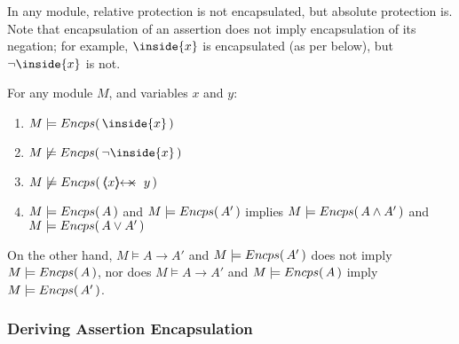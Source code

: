 In any module, relative protection %
is not encapsulated, but  absolute protection is.
 Note  that  encapsulation of an assertion does not imply encapsulation of its negation; 
 for example,  ${\inside{x}}$ is encapsulated (as per below), but $\neg  {\inside{x}}$ is not.


\begin{lemma}
For any module $M$, and variables $x$ and $y$:
\begin{enumerate} 
\item $M \models \encaps{\inside{x}}$
\item $M \not\models {\encaps{\neg\inside{x}}}$
\item $M \not\models {\encaps{\protectedFrom{x}{y}}}$
\item  $M \models  {\ensuremath Encps(\, A\, )}$ and $M \models  {\ensuremath Encps(\, A'\, )}$ implies 
$M \models  {\ensuremath Encps(\, A \wedge A'\, )}$ and $M \models  {\ensuremath Encps(\, A \vee A'\, )}$
\end{enumerate}
\end{lemma}

On the other hand,  $M \models A \rightarrow A'$ and $ M \models  {\ensuremath Encps(\, {A'}\, )}$ does not  imply \ $M \models  {\ensuremath Encps(\, A\, )}$, nor does
$M \models A \rightarrow A'$ and 
 $ M \models  {\ensuremath Encps(\, {A}\, )}$ imply \ $M \models  {\ensuremath Encps(\, A'\, )}$.

%

\subsubsection{Deriving  Assertion Encapsulation}

